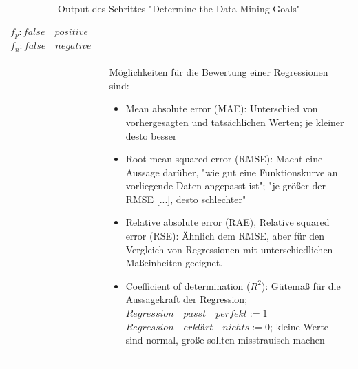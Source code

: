 \begin{centering}
\begin{longtable}[!h]{|p{}|p{12cm}|}
$ f_{p} : false \quad positive $ \newline
$ f_{n} : false \quad negative $ \newline
\\
& Möglichkeiten für die Bewertung einer Regressionen sind:
\begin{itemize}
\item Mean absolute error (MAE): Unterschied von vorhergesagten und tatsächlichen Werten; je kleiner desto besser\citep{mircosoft_evaluate_2017}
\item Root mean squared error (RMSE): Macht eine Aussage darüber, "wie gut eine Funktionskurve an vorliegende Daten angepasst ist"; "je größer der RMSE [...], desto schlechter"\citep{statista_root_nodate}
\item Relative absolute error (RAE), Relative squared error (RSE): Ähnlich dem RMSE, aber für den Vergleich von Regressionen mit unterschiedlichen Maßeinheiten geeignet.\citep{dr._sayad_model_2017}
\item Coefficient of determination ($ R^2 $): Gütemaß für die Aussagekraft der Regression; 
\newline
$Regression \quad passt \quad perfekt := 1$ 
\newline 
$Regression \quad erklärt \quad nichts := 0$;
\newline 
kleine Werte sind normal, große sollten misstrauisch machen\citep{mircosoft_evaluate_2017}
\end{itemize}
\\
\hline
\caption{Output des Schrittes "Determine the Data Mining Goals"}
\end{longtable} \end{centering}



